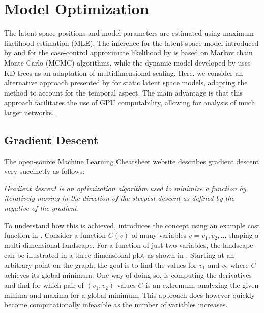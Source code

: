 \section{Model Optimization}

The latent space positions and model parameters are estimated using maximum likelihood estimation (MLE). The inference for the latent space model introduced by \citeauthor*{hoff2002latent} and for the case-control approximate likelihood by \citeauthor*{raftery2012fast} is based on Markov chain Monte Carlo (MCMC) algorithms, while the dynamic model developed by \citeauthor{sarkar2005dynamic} uses KD-trees as an adaptation of multidimensional scaling. Here, we consider an alternative approach presented by \citeauthor{jacobsen2018a} for static latent space models, adapting the method to account for the temporal aspect. The main advantage is that this approach facilitates the use of GPU computability, allowing for analysis of much larger networks.

\subsection{Gradient Descent}

    The open-source \href{https://ml-cheatsheet.readthedocs.io/en/latest/index.html}{Machine Learning Cheatsheet} website describes gradient descent very succinctly as follows:
    \begin{displayquote}\itshape
        Gradient descent is an optimization algorithm used to minimize a function by iteratively moving in the direction of the steepest descent as defined by the negative of the gradient. 
    \end{displayquote}
    
    To understand how this is achieved, \citeauthor{nielsen2018neural} introduces the concept using an example cost function in \cite{nielsen2018neural}.
    Consider a function $C(v)$ of many variables $v = v_1, v_2, \dots$ shaping a multi-dimensional landscape. For a function of just two variables, the landscape can be illustrated in a three-dimensional plot as shown in . 
    Starting at an arbitrary point on the graph, the goal is to find the values for $v_1$ and $v_2$ where $C$ achieves its global minimum. One way of doing so, is computing the derivatives and find for which pair of $(v_1,v_2)$ values $C$ is an extremum, analyzing the given minima and maxima for a global minimum. This approach does however quickly become computationally infeasible as the number of variables increases. 
    
